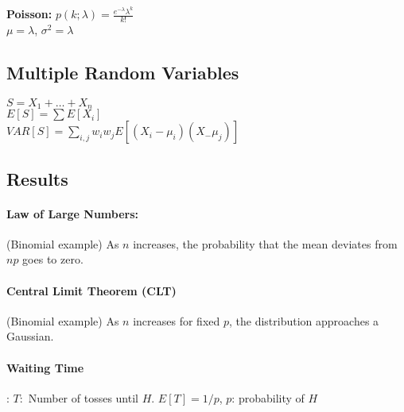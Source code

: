 \textbf{Poisson:} $p(k;\lambda) = \frac{e^{-\lambda}\lambda^k}{k!}$\\
$\mu = \lambda$, $\sigma^2 = \lambda$

\subsection{Multiple Random Variables}

$S= X_1 + \ldots + X_n$ \\
$E[S] = \sum E[X_i]$ \\
$VAR[S] = \sum_{i,j} w_i w_j E[(X_i - \mu_i)(X_ - \mu_j)]$

\subsection{Results}

\paragraph{Law of Large Numbers:}
(Binomial example) As $n$ increases, the probability that the mean deviates from $np$ goes to zero.

\paragraph{Central Limit Theorem (CLT)}
(Binomial example) As $n$ increases for fixed $p$, the distribution approaches a Gaussian.

\paragraph{Waiting Time}: $T:$ Number of tosses until $H$. $E[T] = 1/p$, $p$: probability of $H$